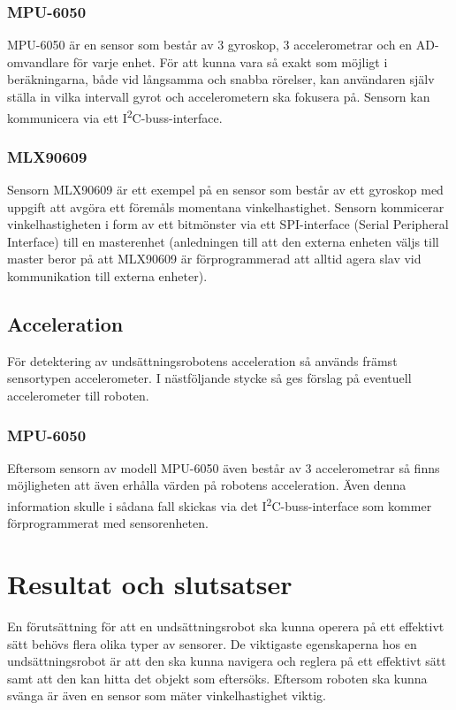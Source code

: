 \documentclass[11pt]{article}
\begin{document}
\begin{flushleft}
\subsubsection{MPU-6050}
MPU-6050 är en sensor som består av 3 gyroskop, 3 accelerometrar och en AD-omvandlare för varje enhet. För att kunna vara så exakt som möjligt i beräkningarna, både vid långsamma och snabba rörelser, kan användaren själv ställa in vilka intervall gyrot och accelerometern ska fokusera på. Sensorn kan kommunicera via ett I\textsuperscript{2}C-buss-interface. \cite{MPU}

\subsubsection{MLX90609}
Sensorn MLX90609 är ett exempel på en sensor som består av ett gyroskop med uppgift att avgöra ett föremåls momentana vinkelhastighet. Sensorn kommicerar vinkelhastigheten i form av ett bitmönster via ett SPI-interface (Serial Peripheral Interface) till en masterenhet (anledningen till att den externa enheten väljs till master beror på att MLX90609 är förprogrammerad att alltid agera slav vid kommunikation till externa enheter). \cite{Melexis}

\subsection{Acceleration}
För detektering av undsättningsrobotens acceleration så används främst sensortypen accelerometer. I nästföljande stycke så ges förslag på eventuell accelerometer till roboten.

\subsubsection{MPU-6050}
Eftersom sensorn av modell MPU-6050 även består av 3 accelerometrar så finns möjligheten att även erhålla värden på robotens acceleration. Även denna information skulle i sådana fall skickas via det I\textsuperscript{2}C-buss-interface som kommer förprogrammerat med sensorenheten. \cite{MPU}


\pagebreak
\section{Resultat och slutsatser}
En förutsättning för att en undsättningsrobot ska kunna operera på ett effektivt sätt behövs flera olika typer av sensorer. De viktigaste egenskaperna hos en undsättningsrobot är att den ska kunna navigera och reglera på ett effektivt sätt samt att den kan hitta det objekt som eftersöks. Eftersom roboten ska kunna svänga är även en sensor som mäter vinkelhastighet viktig.


\end{flushleft}
\end{document}
